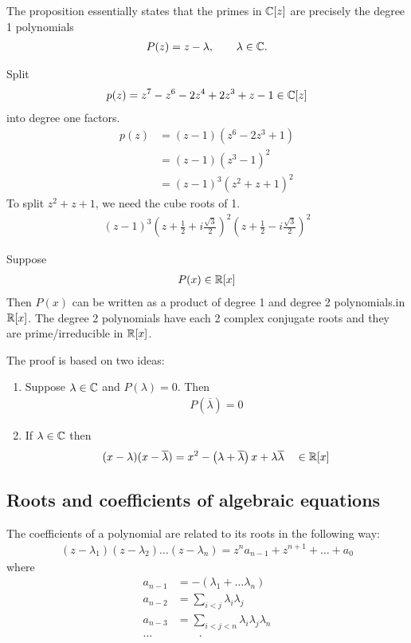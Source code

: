 The proposition essentially states that the primes in $\mathbb C[z]$ are precisely the degree 1 polynomials
\begin{align*}
P(z) = z-\lambda, \qquad \lambda \in \mathbb C.
\end{align*}

\begin{ex}
	Split 
	\begin{align*}
	p(z) = z^7 -z^6 -2z^4+2z^3+z-1 \in \mathbb C[z]
	\end{align*}
	into degree one factors.
	\begin{align*}
	p(z) & = (z-1)(z^6-2z^3+1) \\
	& = (z-1)(z^3-1)^2 \\
	& = (z-1)^3(z^2+z+1)^2
	\end{align*}
	To split $z^2+z+1$, we need the cube roots of 1.
	\begin{align*}
	(z-1)^3 \left(z+\frac 1 2 + i\frac{\sqrt3} 2 \right)^2 \left(z+\frac 1 2 - i\frac{\sqrt3} 2 \right)^2
	\end{align*}
\end{ex}

\begin{pp}
	Suppose
	\begin{align*}
	P(x) \in \mathbb R[x]
	\end{align*}
	Then $P(x)$ can be written as a product of degree 1 and degree 2 polynomials.in $\mathbb R[x]$. The degree 2 polynomials have each 2 complex conjugate roots and they are prime/irreducible in $\mathbb R[x]$.
\end{pp}

The proof is based on two ideas:
\begin{enumerate}
	\item 
	Suppose $\lambda \in \mathbb C$ and $P(\lambda) = 0$. Then 
	\begin{align*}
	P\left( \overline{\lambda} \right) = 0
	\end{align*}
	\item
	If $\lambda \in \mathbb C$ then
	\begin{align*}
	(x- \lambda)(x-\overline \lambda) = x^2 -\left(\lambda+\overline \lambda\right) x + \lambda \overline \lambda \quad \in \mathbb R[x]
	\end{align*}
\end{enumerate}

\subsection{Roots and coefficients of algebraic equations}
The coefficients of a polynomial are related to its roots in the following way:
\begin{align*}
(z-\lambda_1)(z-\lambda_2) \dots (z-\lambda_n) = z^n a_{n-1} + z^{n+1} + \dots + a_0
\end{align*}
where
\begin{align*}
a_{n-1} & = -(\lambda_1 + \dots \lambda_n) \\
a_{n-2} & = \sum_{i<j} \lambda_i \lambda_j \\
a_{n-3} & = \sum_{i<j<n} \lambda_i \lambda_j \lambda_n \\
\dots & \qquad .
\end{align*}

